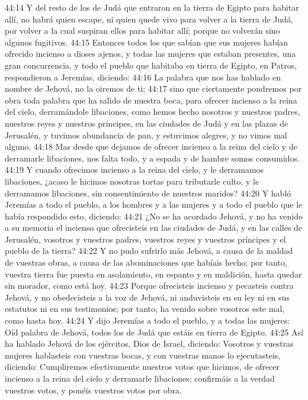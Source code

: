 44:14 Y del resto de los de Judá que entraron en la tierra de Egipto para habitar allí, no habrá quien escape, ni quien quede vivo para volver a la tierra de Judá, por volver a la cual suspiran ellos para habitar allí; porque no volverán sino algunos fugitivos.  
44:15 Entonces todos los que sabían que sus mujeres habían ofrecido incienso a dioses ajenos, y todas las mujeres que estaban presentes, una gran concurrencia, y todo el pueblo que habitaba en tierra de Egipto, en Patros, respondieron a Jeremías, diciendo:  
44:16 La palabra que nos has hablado en nombre de Jehová, no la oiremos de ti;  
44:17 sino que ciertamente pondremos por obra toda palabra que ha salido de nuestra boca, para ofrecer incienso a la reina del cielo, derramándole libaciones, como hemos hecho nosotros y nuestros padres, nuestros reyes y nuestros príncipes, en las ciudades de Judá y en las plazas de Jerusalén, y tuvimos abundancia de pan, y estuvimos alegres, y no vimos mal alguno.  
44:18 Mas desde que dejamos de ofrecer incienso a la reina del cielo y de derramarle libaciones, nos falta todo, y a espada y de hambre somos consumidos.  
44:19 Y cuando ofrecimos incienso a la reina del cielo, y le derramamos libaciones, ¿acaso le hicimos nosotras tortas para tributarle culto, y le derramamos libaciones, sin consentimiento de nuestros maridos?  
44:20 Y habló Jeremías a todo el pueblo, a los hombres y a las mujeres y a todo el pueblo que le había respondido esto, diciendo:  
44:21 ¿No se ha acordado Jehová, y no ha venido a su memoria el incienso que ofrecisteis en las ciudades de Judá, y en las calles de Jerusalén, vosotros y vuestros padres, vuestros reyes y vuestros príncipes y el pueblo de la tierra?  
44:22 Y no pudo sufrirlo más Jehová, a causa de la maldad de vuestras obras, a causa de las abominaciones que habíais hecho; por tanto, vuestra tierra fue puesta en asolamiento, en espanto y en maldición, hasta quedar sin morador, como está hoy.  
44:23 Porque ofrecisteis incienso y pecasteis contra Jehová, y no obedecisteis a la voz de Jehová, ni anduvisteis en su ley ni en sus estatutos ni en sus testimonios; por tanto, ha venido sobre vosotros este mal, como hasta hoy.  
44:24 Y dijo Jeremías a todo el pueblo, y a todas las mujeres: Oíd palabra de Jehová, todos los de Judá que estáis en tierra de Egipto.  
44:25 Así ha hablado Jehová de los ejércitos, Dios de Israel, diciendo: Vosotros y vuestras mujeres hablasteis con vuestras bocas, y con vuestras manos lo ejecutasteis, diciendo: Cumpliremos efectivamente nuestros votos que hicimos, de ofrecer incienso a la reina del cielo y derramarle libaciones; confirmáis a la verdad vuestros votos, y ponéis vuestros votos por obra.  
